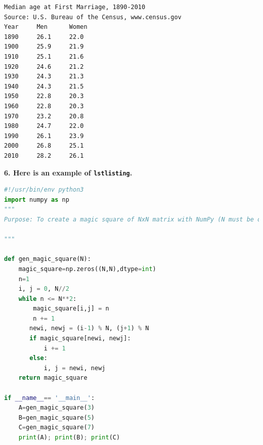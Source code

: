 \documentclass[12pt]{article}
\begin{document}
\begin{verbatim}
Median age at First Marriage, 1890-2010
Source: U.S. Bureau of the Census, www.census.gov
Year     Men      Women
1890     26.1     22.0
1900     25.9     21.9
1910     25.1     21.6
1920     24.6     21.2
1930     24.3     21.3
1940     24.3     21.5
1950     22.8     20.3
1960     22.8     20.3
1970     23.2     20.8
1980     24.7     22.0
1990     26.1     23.9
2000     26.8     25.1
2010     28.2     26.1
\end{verbatim}

\noindent \textbf{6. Here is an example of \texttt{lstlisting}.} 
\begin{lstlisting}[language=Python]
#!/usr/bin/env python3 
import numpy as np
"""
Purpose: To create a magic square of NxN matrix with NumPy (N must be odd)

"""

def gen_magic_square(N):
    magic_square=np.zeros((N,N),dtype=int)
    n=1
    i, j = 0, N//2
    while n <= N**2:
        magic_square[i,j] = n
        n += 1
       newi, newj = (i-1) % N, (j+1) % N
       if magic_square[newi, newj]:
           i += 1
       else:
           i, j = newi, newj
    return magic_square

if __name__== '__main__':
    A=gen_magic_square(3)
    B=gen_magic_square(5)
    C=gen_magic_square(7)
    print(A); print(B); print(C)
\end{lstlisting}
\end{document}
